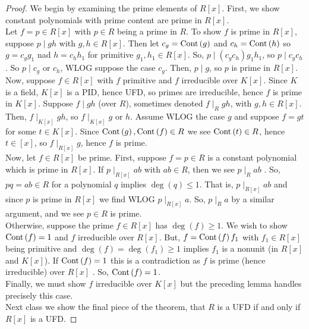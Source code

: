 \begin{proof}
	We begin by examining the prime elements of \(R\left[ x \right] \). First, we show constant polynomials with prime content are prime in \(R\left[ x \right] \).\\
	Let \(f = p \in R\left[ x \right] \) with \(p \in R\) being a prime in \(R\). To show \(f\) is prime in \(R\left[ x \right] \),  suppose \( p \mid gh \) with \(g, h \in R\left[ x \right] \). Then let \(c_{g} = \operatorname{Cont}\left( g \right) \) and \(c_{h} = \operatorname{Cont}\left( h \right) \) so \(g = c_{g}g_1\) nad \(h = c_{h }h_1\) for primitive \(g_1, h_1 \in R\left[ x \right] \). So, \(p \mid \left( c_{g}c_{h} \right) g_1 h_1 \), so \(p \mid c_{g}c_{h}\). So \(p \mid c_{g}\) or \(c_{h}\), WLOG suppose the case \(c_{g}\). Then, \(p \mid g\), so \(p\) is prime in \(R\left[ x \right] \).\\
	Now, suppose \(f \in R\left[ x \right] \) with \(f\) primitive and \(f\) irreducible over \(K\left[ x \right] \). Since \(K\) is a field, \(K\left[ x \right] \) is a PID, hence UFD, so primes are irreducible, hence \(f\) is prime in \(K\left[ x \right] \). Suppose \(f \mid gh\) (over \(R\)), sometimes denoted \(f \mid_{R} gh\), with \(g, h \in R\left[ x \right] \). Then, \(f \mid_{K\left[ x \right] } gh\), so \(f \mid_{K\left[ x \right] } g\) or \(h\). Assume WLOG the case \(g\) and suppose \(f = gt\) for some \(t \in K\left[ x \right] \). Since \(\operatorname{Cont}\left( g \right), \operatorname{Cont}\left( f \right)  \in R\) we see \(\operatorname{Cont}\left( t \right)  \in R\), hence \(t \in \left[ x \right] \), so \(f \mid_{R\left[ x \right] } g\), hence \(f\) is prime.\\
	Now, let \(f \in R\left[ x \right] \) be prime. First, suppose \(f = p \in R\) is a constant polynomial which is prime in \(R\left[ x \right] \). If \(p \mid_{R\left[ x \right] } ab\) with \(ab \in R\), then we see \(p \mid_{R} ab\) . So, \(pq = ab \in R\) for a polynomial \(q\) implies \(\deg \left( q \right) \le 1\). That is, \(p \mid_{R\left[ x \right] }ab\) and since \(p\) is prime in \(R\left[ x \right] \) we find WLOG \(p \mid_{R\left[ x \right] }a\). So, \(p \mid_{R} a\) by a similar argument, and we see \(p \in R\) is prime.\\
	Otherwise, suppose the prime \(f \in R\left[ x \right] \) has \(\deg \left( f \right) \ge 1\). We wish to show \(\operatorname{Cont}\left( f \right)  = 1\) and \(f\) irreducible over \(R\left[ x \right] \). But, \(f = \operatorname{Cont}\left( f \right) f_1\) with \(f_1 \in R\left[ x \right] \) being primitive and \(\deg \left( f \right)  = \deg \left( f_1 \right)  \ge 1\) implies \(f_1\) is a nonunit (in \(R\left[ x \right] \) and \(K\left[ x \right] \)). If \(\operatorname{Cont}\left( f \right)  = 1\) this is a contradiction as \(f\) is prime (hence irreducible) over \(R\left[ x \right] \) . So, \(\operatorname{Cont}\left( f \right)  =1\).\\
	Finally, we must show \(f\) irreducible over \(K\left[x  \right] \) but the preceding lemma handles precisely this case.\\
	Next class we show the final piece of the theorem, that \(R\) is a UFD if and only if \(R\left[ x \right] \) is a UFD.
\end{proof}
